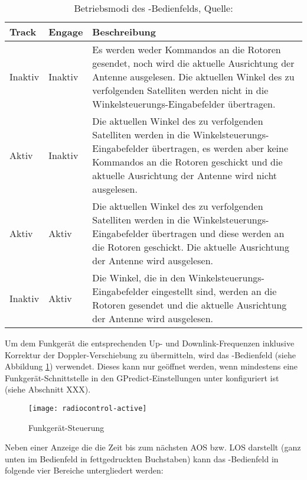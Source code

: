 \begin{table}[h]
	\begin{tabularx}{\textwidth}{|l|l|X|}
		\hline
		\textbf{Track} 	    & \textbf{Engage}	&\textbf{Beschreibung}\\
		\hline
		Inaktiv          	& Inaktiv 			& Es werden weder Kommandos an die Rotoren gesendet, noch wird die aktuelle Ausrichtung der Antenne ausgelesen. Die aktuellen Winkel des zu verfolgenden Satelliten werden nicht in die Winkelsteuerungs-Eingabefelder übertragen.\\
		Aktiv              	& Inaktiv   		& Die aktuellen Winkel des zu verfolgenden Satelliten werden in die Winkelsteuerungs-Eingabefelder übertragen, es werden aber keine Kommandos an die Rotoren geschickt und die aktuelle Ausrichtung der Antenne wird nicht ausgelesen.\\
		Aktiv              	& Aktiv	            & Die aktuellen Winkel des zu verfolgenden Satelliten werden in die Winkelsteuerungs-Eingabefelder übertragen und diese werden an die Rotoren geschickt. Die aktuelle Ausrichtung der Antenne wird ausgelesen.\\
		Inaktiv            	& Aktiv   			& Die Winkel, die in den Winkelsteuerungs-Eingabefelder eingestellt sind, werden an die Rotoren gesendet und die aktuelle Ausrichtung der Antenne wird ausgelesen.\\
		\hline		
	\end{tabularx}
	\caption{Betriebsmodi des -Bedienfelds, Quelle: \cite{gpredictmanual} \vspace{-2em}}
	\label{tab:rotatorcontrolmodes}
\end{table}

\newpage

Um dem Funkgerät die entsprechenden Up- und Downlink-Frequenzen inklusive Korrektur der Doppler-Verschiebung zu übermitteln, wird das -Bedienfeld (siehe Abbildung \ref{fig:radiocontrol}) verwendet. Dieses kann nur geöffnet werden, wenn mindestens eine Funkgerät-Schnittstelle in den GPredict-Einstellungen unter  konfiguriert ist (siehe Abschnitt XXX).

\begin{figure}[h]
	\centering
	\texttt{[image: radiocontrol-active]}
	\caption{Funkgerät-Steuerung}
	\label{fig:radiocontrol} 
\end{figure}

Neben einer Anzeige die die Zeit bis zum nächsten \ac{AOS} bzw. \ac{LOS} darstellt (ganz unten im Bedienfeld in fettgedruckten Buchstaben) kann das -Bedienfeld in folgende vier Bereiche untergliedert werden:

